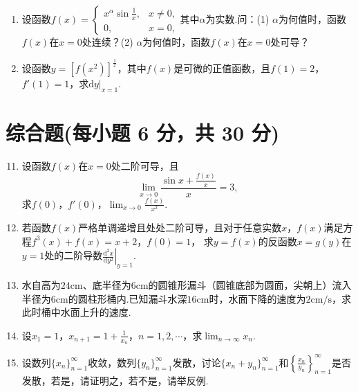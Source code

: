 \documentclass[../main.tex]{subfiles}
\begin{document}
\begin{enumerate}
    \item 设函数$f(x)=
              \begin{cases}
                  x^{\alpha}\sin\frac{1}{x}, & x\neq0, \\
                  0,                         & x=0,
              \end{cases}$其中$\alpha$为实数.问：(1) $\alpha$为何值时，函数$f(x)$在$x=0$处连续？(2)
          $\alpha$为何值时，函数$f(x)$在$x=0$处可导？
          \vspace{9em}

    \item 设函数$y=\left[f(x^{2})\right]^{\frac{1}{x}}$，其中$f(x)$是可微的正值函数，且$f(1)=2$，$f'(1)=1$，求$\left.
              \mathrm{d}y\right|_{x=1}$.
          \vspace{9em}
\end{enumerate}

\section{综合题(每小题 6 分，共 30 分)}
\begin{enumerate}
    \setcounter{enumi}{10}
    \item 设函数$f(x)$在$x=0$处二阶可导，且
          \[
              \lim_{x\to0}\frac{\sin x+\frac{f(x)}{x}}{x}=3,
          \]
          求$f(0)$，$f'(0)$，$\lim_{x\to0}\frac{f(x)}{x^{2}}$.
          \vspace{10em}

    \item 若函数$f(x)$严格单调递增且处处二阶可导，且对于任意实数$x$，$f(x)$满足方程$f^{3}(x)+f(x)=x+2$，$f(0)=1$，
          求$y=f(x)$的反函数$x=g(y)$在$y=1$处的二阶导数$\left.\frac{\mathrm{d}^{2}x}{\mathrm{d}y^{2}}\right|_{y=1}$.
          \vspace{10em}

    \item 水自高为$24\mathrm{cm}$、底半径为$6\mathrm{cm}$的圆锥形漏斗（圆锥底部为圆面，尖朝上）流入半径为$6
              \mathrm{cm}$的圆柱形桶内.已知漏斗水深$16\mathrm{cm}$时，水面下降的速度为$2\mathrm{cm/s}$，求此时桶中水面上升的速度.
          \vspace{12em}

    \item 设$x_{1}=1$，$x_{n+1}=1+\frac{1}{x_{n}}$，$n=1,2,\cdots$，求$\lim_{n\to\infty}x_{n}$.
          \vspace{12em}

    \item 设数列$\{x_{n}\}_{n=1}^{\infty}$收敛，数列$\{y_{n}\}_{n=1}^{\infty}$发散，讨论$\{x_{n}+y_{n}\}_{n=1}^{\infty}$和$\left\{
              \frac{x_{n}}{y_{n}}\right\}_{n=1}^{\infty}$是否发散，若是，请证明之，若不是，请举反例.
          \vspace{10em}
\end{enumerate}
\end{document}
